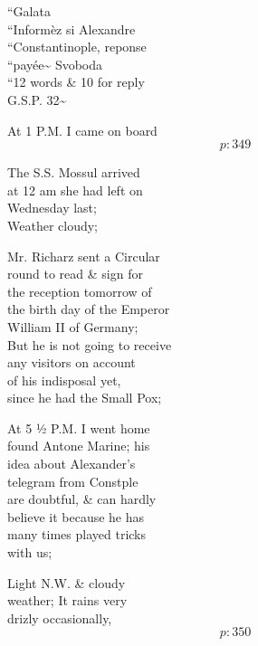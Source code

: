 \documentclass{report}
\begin{document}
	\par{
 	“Galata\ \\“Informèz si Alexandre\ \\“Constantinople, reponse\ \\“payée\~{} Svoboda\ \\“12 words \& 10 for reply\ \\G.S.P. 32\~{}\ \\
	}

	\par{
 	At 1 P.M. I came on board\ \\
  \[p: 349 \]

	}



	\par{
 	The S.S. Mossul arrived\ \\at 12 am she had left on\ \\Wednesday last;\ \\Weather cloudy;\ \\
	}

	\par{
 	Mr. Richarz sent a Circular\ \\round to read \& sign for\ \\the reception tomorrow of\ \\the birth day of the Emperor\ \\William II of Germany;\ \\But he is not going to receive\ \\any visitors on account\ \\of his indisposal yet,\ \\since he had the Small Pox;\ \\
	}

	\par{
 	At 5 ½ P.M. I went home\ \\found Antone Marine; his\ \\idea about Alexander’s\ \\telegram from Constple\ \\are doubtful, \& can hardly\ \\believe it because he has\ \\many times played tricks\ \\with us;\ \\
	}

	\par{
 	Light N.W. \& cloudy\ \\weather; It rains very\ \\drizly occasionally,\ \\
  \[p: 350 \]

	}
\end{document}
